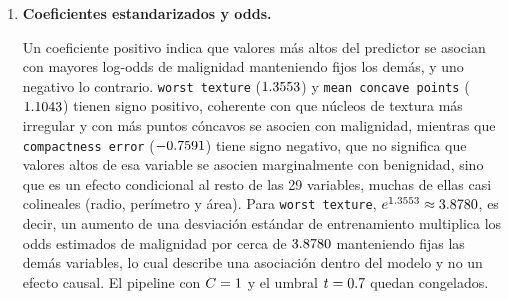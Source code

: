 \begin{enumerate}
\item \textbf{Coeficientes estandarizados y odds.}

\begin{table}[H]
\centering
\small

\caption{Diez mayores coeficientes estandarizados (en magnitud) de la regresión logística con $C=\LogitC$.}
\label{tab:ex8-coef}
\end{table}

Un coeficiente positivo indica que valores más altos del predictor se asocian
con mayores log-odds de malignidad manteniendo fijos los demás, y uno negativo
lo contrario. \texttt{worst texture} ($1.3553$) y \texttt{mean
concave points} ($1.1043$) tienen signo positivo, coherente con
que núcleos de textura más irregular y con más puntos cóncavos se asocien con
malignidad, mientras que \texttt{compactness error} ($-0.7591$)
tiene signo negativo, que no significa que valores altos de esa variable se
asocien marginalmente con benignidad, sino que es un efecto condicional al
resto de las 29 variables, muchas de ellas casi colineales (radio, perímetro
y área). Para \texttt{worst texture}, $e^{1.3553}\approx
3.8780$, es decir, un aumento de una desviación estándar de
entrenamiento multiplica los odds estimados de malignidad por cerca de
$3.8780$ manteniendo fijas las demás variables, lo cual describe una
asociación dentro del modelo y no un efecto causal. El pipeline con
$C=\LogitC$ y el umbral $t=0.7$ quedan congelados.

\end{enumerate}
